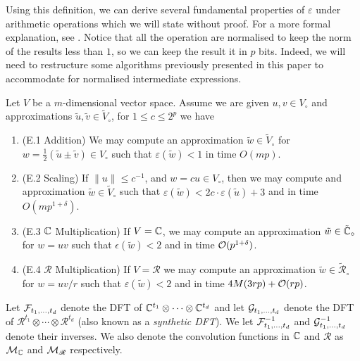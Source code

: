 Using this definition, we can derive several fundamental properties of $\varepsilon$ under arithmetic operations which we will state without proof. For a more formal explanation, see \cite{nlogn}. Notice that all the operation are normalised to keep the norm of the results less than $1$, so we can keep the result it in $p$ bits. Indeed, we will need to restructure some algorithms previously presented in this paper to accommodate for normalised intermediate expressions.

\begin{proposition}
    Let $V$ be a $m$-dimensional vector space. Assume we are given $u, v \in V_\circ$ and approximations $\tilde{u}, \tilde{v} \in \tilde{V}_\circ$, for $1 \le c \le 2^p$ we have
    \begin{enumerate}
        \item (E.1 Addition) We may compute an approximation $\tilde{w} \in \tilde{V}_\circ$ for $w = \tfrac{1}{2}(\tilde{u} \pm \tilde{v}) \in V_\circ$ such that $\varepsilon(\tilde{w}) < 1$ in time $O(mp)$.
        \item (E.2 Scaling) If $\|u\| \le c^{-1}$, and $w = cu \in V_\circ$, then we may compute and approximation $\tilde{w} \in \tilde{V}_\circ$ such that $\varepsilon(\tilde{w}) < 2c \cdot \varepsilon(\tilde{u}) + 3$ and in time $O(mp^{1 + \delta})$.
        \item (E.3 ${\mathbb C}$ Multiplication) If $V = {\mathbb C}$, we may compute an approximation $\tilde{w} \in \tilde{{\mathbb C}}_\circ$ for $w = uv$ such that $\epsilon(\tilde{w}) < 2$ and in time $\mathcal O(p^{1 + \delta})$.
        \item (E.4 $\mathscr{R}$ Multiplication) If $V = \mathscr{R}$ we may compute an approximation $\tilde{w} \in \tilde{\mathscr{R}}_\circ$ for $w = uv/r$ such that $\varepsilon(\tilde{w}) < 2$ and in time $4M(3rp) + \mathcal O(rp)$.
    \end{enumerate}
\end{proposition}

Let $\mathcal F_{t_1, \ldots, t_d}$ denote the DFT of ${\mathbb C}^{t_1} \otimes \cdots \otimes {\mathbb C}^{t_d}$ and let $\mathcal G_{t_1, \ldots, t_d}$ denote the DFT of $\mathscr{R}^{t_1} \otimes \cdots \otimes \mathscr{R}^{t_d}$ (also known as a \emph{synthetic DFT}).
We let $\mathcal F^{-1}_{t_1, \ldots, t_d}$ and $\mathcal G_{t_1, \ldots, t_d}^{-1}$ denote their inverses.
We also denote the convolution functions in ${\mathbb C}$ and $\mathscr{R}$ as $\mathcal M_{\mathbb C}$ and $\mathcal M_\mathscr{R}$ respectively.

